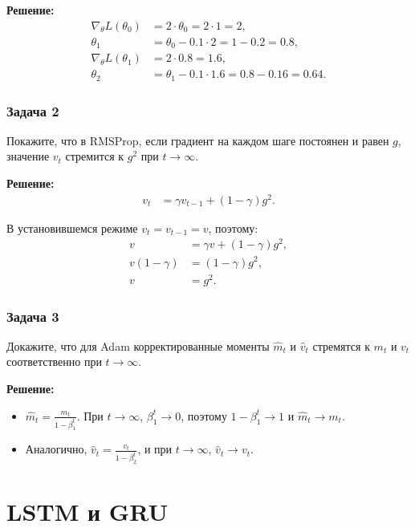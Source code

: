 \textbf{Решение:}
\begin{align*}
	\nabla_\theta L(\theta_0) & = 2 \cdot \theta_0 = 2 \cdot 1 = 2,             \\
	\theta_1                  & = \theta_0 - 0.1 \cdot 2 = 1 - 0.2 = 0.8,       \\
	\nabla_\theta L(\theta_1) & = 2 \cdot 0.8 = 1.6,                            \\
	\theta_2                  & = \theta_1 - 0.1 \cdot 1.6 = 0.8 - 0.16 = 0.64.
\end{align*}

\subsubsection*{Задача 2}
Покажите, что в RMSProp, если градиент на каждом шаге постоянен и равен $g$, значение $v_t$ стремится к $g^2$ при $t \to \infty$.

\textbf{Решение:}
\begin{align*}
	v_t & = \gamma v_{t-1} + (1 - \gamma) g^2.
\end{align*}

В установившемся режиме $v_t = v_{t-1} = v$, поэтому:
\begin{align*}
	v              & = \gamma v + (1 - \gamma) g^2, \\
	v (1 - \gamma) & = (1 - \gamma) g^2,            \\
	v              & = g^2.
\end{align*}

\subsubsection*{Задача 3}
Докажите, что для Adam корректированные моменты $\hat{m}_t$ и $\hat{v}_t$ стремятся к $m_t$ и $v_t$ соответственно при $t \to \infty$.

\textbf{Решение:}
\begin{itemize}
	\item $\hat{m}_t = \frac{m_t}{1 - \beta_1^t}$. При $t \to \infty$, $\beta_1^t \to 0$, поэтому $1 - \beta_1^t \to 1$ и $\hat{m}_t \to m_t$.
	\item Аналогично, $\hat{v}_t = \frac{v_t}{1 - \beta_2^t}$, и при $t \to \infty$, $\hat{v}_t \to v_t$.
\end{itemize}

\section{LSTM и GRU}

